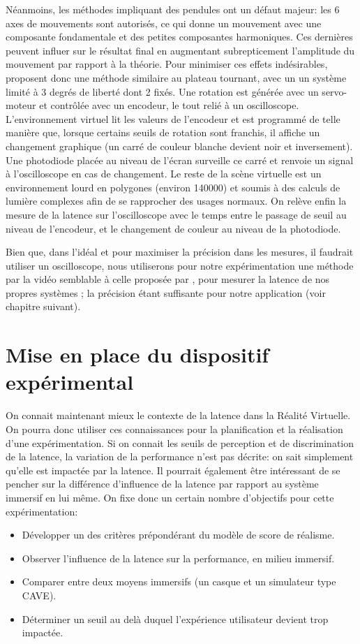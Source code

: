 	\par Néanmoins, les méthodes impliquant des pendules ont un défaut majeur: les 6 axes de mouvements sont autorisés, ce qui donne un mouvement avec une composante fondamentale et des petites composantes harmoniques. Ces dernières peuvent influer sur le résultat final en augmentant subrepticement l'amplitude du mouvement par rapport à la théorie. Pour minimiser ces effets indésirables, \citep{papadakis_system_2011} proposent donc une méthode similaire au plateau tournant, avec un un système limité à 3 degrés de liberté dont 2 fixés. Une rotation est générée avec un servo-moteur et contrôlée avec un encodeur, le tout relié à un oscilloscope. L'environnement virtuel lit les valeurs de l'encodeur et est programmé de telle manière que, lorsque certains seuils de rotation sont franchis, il affiche un changement graphique (un carré de couleur blanche devient noir et inversement). Une photodiode placée au niveau de l'écran surveille ce carré et renvoie un signal à l'oscilloscope en cas de changement. Le reste de la scène virtuelle est un environnement lourd en polygones (environ 140000) et soumis à des calculs de lumière complexes afin de se rapprocher des usages normaux. On relève enfin la mesure de la latence sur l'oscilloscope avec le temps entre le passage de seuil au niveau de l'encodeur, et le changement de couleur au niveau de la photodiode.
	
	\par Bien que, dans l'idéal et pour maximiser la précision dans les mesures, il faudrait utiliser un oscilloscope, nous utiliserons pour notre expérimentation une méthode par la vidéo semblable à celle proposée par \citep{steed_simple_2008}, pour mesurer la latence de nos propres systèmes ; la précision étant suffisante pour notre application (voir chapitre suivant).
	
	
\chapter{Mise en place du dispositif expérimental}
	\par On connait maintenant mieux le contexte de la latence dans la Réalité Virtuelle. On pourra donc utiliser ces connaissances pour la planification et la réalisation d'une expérimentation. Si on connait les seuils de perception et de discrimination de la latence, la variation de la performance n'est pas décrite: on sait simplement qu'elle est impactée par la latence. Il pourrait également être intéressant de se pencher sur la différence d'influence de la latence par rapport au système immersif en lui même. On fixe donc un certain nombre d'objectifs pour cette expérimentation:
	\begin{itemize}
		\item Développer un des critères prépondérant du modèle de score de réalisme.
		\item Observer l'influence de la latence sur la performance, en milieu immersif.
		\item Comparer entre deux moyens immersifs (un casque et un simulateur type CAVE).
		\item Déterminer un seuil au delà duquel l'expérience utilisateur devient trop impactée. 
	\end{itemize}
	
